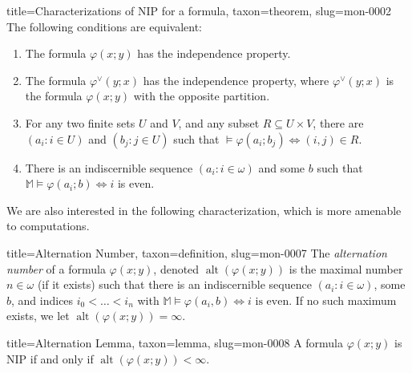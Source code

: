 \documentclass[a4paper]{article}
\begin{document}
\begin{tree}{title={Characterizations of NIP for a formula}, taxon={theorem}, slug={mon-0002}}
The following conditions are equivalent:
\begin{enumerate}
\item{ The formula \(\varphi (x;y)\) has the independence property.}
  \item{ The formula \(\varphi ^{ \vee }(y;x)\) has the independence property,
	where \(\varphi ^{ \vee }(y;x)\) is the formula \(\varphi (x;y)\) with the
	opposite partition.}
	\item{ For any two finite sets \(U\) and \(V\), and any subset \(R  \subseteq  U  \times  V\), there are \((a_i : i  \in  U)\) and \((b_j : j  \in  U)\) such that \(\mathbb   \models   \varphi (a_i;b_j)  \Longleftrightarrow  (i,j)  \in  R\).}
	\item{ There is an indiscernible sequence \((a_i : i  \in   \omega )\)
	and some \(b\) such that \(\mathbb  M  \models   \varphi (a_i;b)  \Longleftrightarrow  i\)
	is even.}
\end{enumerate}\par{We are also interested in the following characterization, which is more amenable to computations.}
\begin{tree}{title={Alternation Number}, taxon={definition}, slug={mon-0007}}
The \emph{alternation number} of a formula \(\varphi (x;y)\), denoted \(\operatorname {alt}( \varphi (x;y))\) is the maximal number \(n  \in   \omega\) (if it exists) such that there is an indiscernible sequence \((a_i : i  \in   \omega )\), some \(b\), and indices \(i_0 <  \dots  < i_n\) with \(\mathbb  M  \models   \varphi (a_i,b)  \Longleftrightarrow  i  \text { is even}\). If no such maximum exists, we let \(\operatorname {alt}( \varphi (x;y)) =  \infty\).
\end{tree}

\begin{tree}{title={Alternation Lemma}, taxon={lemma}, slug={mon-0008}}
A formula \(\varphi (x;y)\) is NIP if and only if \(\operatorname {alt}( \varphi (x;y)) <  \infty\).
\end{tree}

\end{tree}

\printbibliography
\end{document}
